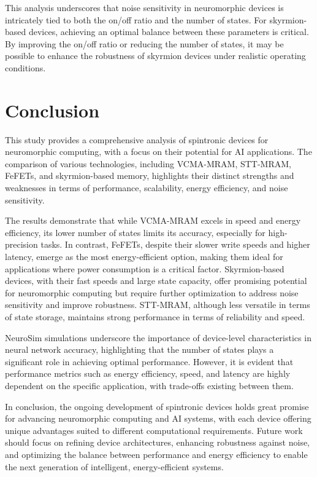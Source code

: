 \documentclass[conference]{IEEEtran}
\begin{document}
This analysis underscores that noise sensitivity in neuromorphic devices is intricately tied to both the on/off ratio and the number of states. For skyrmion-based devices, achieving an optimal balance between these parameters is critical. By improving the on/off ratio or reducing the number of states, it may be possible to enhance the robustness of skyrmion devices under realistic operating conditions.

\section{Conclusion}
This study provides a comprehensive analysis of spintronic devices for neuromorphic computing, with a focus on their potential for AI applications. The comparison of various technologies, including VCMA-MRAM, STT-MRAM, FeFETs, and skyrmion-based memory, highlights their distinct strengths and weaknesses in terms of performance, scalability, energy efficiency, and noise sensitivity.

The results demonstrate that while VCMA-MRAM excels in speed and energy efficiency, its lower number of states limits its accuracy, especially for high-precision tasks. In contrast, FeFETs, despite their slower write speeds and higher latency, emerge as the most energy-efficient option, making them ideal for applications where power consumption is a critical factor. Skyrmion-based devices, with their fast speeds and large state capacity, offer promising potential for neuromorphic computing but require further optimization to address noise sensitivity and improve robustness. STT-MRAM, although less versatile in terms of state storage, maintains strong performance in terms of reliability and speed.

NeuroSim simulations underscore the importance of device-level characteristics in neural network accuracy, highlighting that the number of states plays a significant role in achieving optimal performance. However, it is evident that performance metrics such as energy efficiency, speed, and latency are highly dependent on the specific application, with trade-offs existing between them.

In conclusion, the ongoing development of spintronic devices holds great promise for advancing neuromorphic computing and AI systems, with each device offering unique advantages suited to different computational requirements. Future work should focus on refining device architectures, enhancing robustness against noise, and optimizing the balance between performance and energy efficiency to enable the next generation of intelligent, energy-efficient systems.


\printbibliography%
\end{document}
